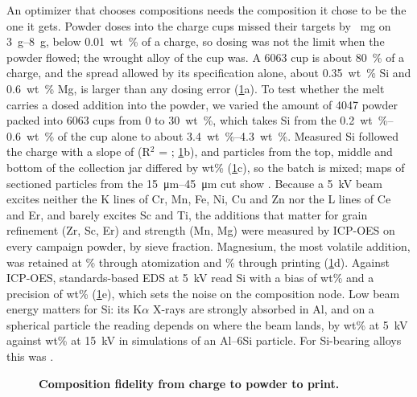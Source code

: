 \documentclass[11pt]{article}
\begin{document}
An optimizer that chooses compositions needs the composition it chose to be the
one it gets. Powder doses into the charge cups missed their targets by
~mg on \SIrange{3}{8}{\gram}, below \SI{0.01}{wt\percent} of a
charge, so dosing was not the limit when the powder
flowed; the wrought alloy of the cup was. A 6063 cup is about \SI{80}{\percent} of
a charge, and the spread allowed by its specification alone, about
\SI{0.35}{wt\percent} Si and \SI{0.6}{wt\percent} Mg, is larger than any dosing
error (\cref{fig:fidelity}a). To test whether the melt carries a dosed
addition into the powder, we varied the amount of 4047 powder packed into 6063
cups from 0 to \SI{30}{wt\percent}, which takes Si from the
\SIrange{0.2}{0.6}{wt\percent} of the cup alone to about
\SIrange{3.4}{4.3}{wt\percent}. Measured Si followed the charge with a slope of  (R$^2$ = ;
\cref{fig:fidelity}b), and particles from the top, middle and bottom of the
collection jar differed by  wt\% (\cref{fig:fidelity}c), so the batch is
mixed; maps of sectioned particles from the \SIrange{15}{45}{\micro\metre} cut
show . Because a \SI{5}{\kilo\volt} beam
excites neither the K lines of Cr, Mn, Fe, Ni, Cu and Zn nor the L lines of Ce and
Er, and barely excites Sc and Ti, the additions that matter for grain refinement
(Zr, Sc, Er) and strength (Mn, Mg) were measured by ICP-OES on every campaign
powder, by sieve fraction. Magnesium, the most
volatile addition, was retained at \% through atomization and \%
through printing (\cref{fig:fidelity}d). Against ICP-OES, standards-based EDS at \SI{5}{\kilo\volt} read Si with a bias
of  wt\% and a precision of  wt\% (\cref{fig:fidelity}e),
which sets the noise on the composition node. Low beam energy matters for Si: its
K$\alpha$ X-rays are strongly absorbed in Al, and on a spherical particle the
reading depends on where the beam lands, by  wt\% at
\SI{5}{\kilo\volt} against  wt\% at \SI{15}{\kilo\volt} in
simulations of an Al--6Si particle. For Si-bearing alloys this
was .

\begin{figure}[t]
\centering
{}
\caption{\textbf{Composition fidelity from charge to powder to print.}
}
\label{fig:fidelity}
\end{figure}
\end{document}
